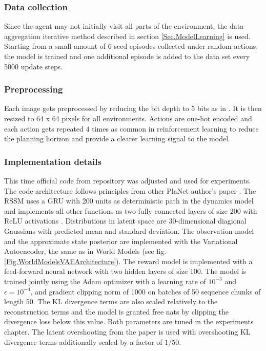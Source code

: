 \subsubsection{Data collection}

Since the agent may not initially visit all parts of the environment, the data-aggregation iterative method described in section \ref{Sec.ModelLearning} is used. Starting from a small amount of 6 seed episodes collected under random actions, the model is trained and one additional episode is added to the data set every 5000 update steps.

\subsubsection{Preprocessing}

Each image gets preprocessed by reducing the bit depth to 5 bits as in \cite{Algo.Glow5bit}. It is then resized to 64 x 64 pixels for all environments.
Actions are one-hot encoded and each action gets repeated 4 times as common in reinforcement learning \cite{Algo.DQN} to reduce the planning horizon and provide a clearer learning signal to the model.

\subsubsection{Implementation details}

This time official code from repository \cite{Code.PlaNet} was adjusted and used for experiments. The code architecture follows principles from other PlaNet author's paper \cite{Code.TFAgents}.
The RSSM uses a GRU \cite{Algo.GRU} with 200 units as deterministic path in the dynamics model and implements all other functions as two fully connected layers of size 200 with ReLU activations \cite{Algo.ReLU}. Distributions in latent space are 30-dimensional diagional Gaussians with predicted mean and standard deviation.
The observation model and the approximate state posterior are implemented with the Variational Autoencoder, the same as in World Models (see fig.\ref{Fig.WorldModelsVAEArchitecture}). The reward model is implemented with a feed-forward neural network with two hidden layers of size 100.
The model is trained jointly using the Adam optimizer \cite{Algo.Adam} with a learning rate of $10^{-3}$ and $\epsilon = 10^{−4}$, and gradient clipping norm of 1000 on batches of 50 sequence chunks of length 50. The KL divergence terms are also scaled relatively to the reconstruction terms and the model is granted free nats by clipping the divergence loss below this value. Both parameters are tuned in the experiments chapter. The latent overshooting from the paper \cite{Algo.PlaNet} is used with overshooting KL divergence terms additionally scaled by a factor of $1/50$. 

